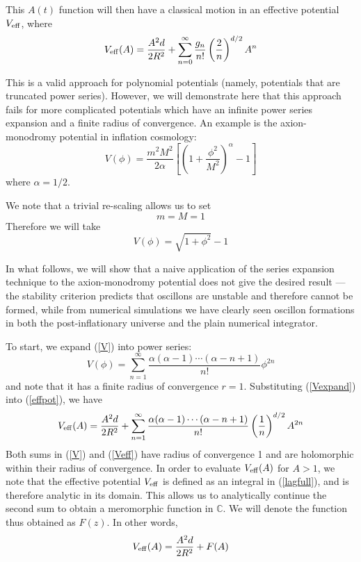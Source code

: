 \documentclass{report}
\begin{document}
This $A(t)$ function will then have a classical motion in an effective potential $V_{\rm eff}$, where
\begin{equation}\label{effpot}
  V_{\rm eff}(A) = \frac{A^2d}{2R^2} +
  \sum_{n=0}^\infty \frac{g_n}{n!}\left(\frac{2}{n}\right)^{d/2} A^n
\end{equation}

This is a valid approach for polynomial potentials (namely, potentials that are truncated power series). However, we will demonstrate here that this approach fails for more complicated potentials which have an infinite power series expansion and a finite radius of convergence. An example is the axion-monodromy potential in inflation cosmology:
\begin{equation}
  V(\phi) = \frac{m^2M^2}{2\alpha}\left[\left(1+\frac{\phi^2}{M^2}\right)^\alpha-1\right]
\end{equation}
where $\alpha=1/2$.

We note that a trivial re-scaling allows us to set
\begin{equation}
  m=M=1
\end{equation}
Therefore we will take
\begin{equation}\label{V}
  V(\phi)=\sqrt{1+\phi^2}-1
\end{equation}

In what follows, we will show that a naive application of the series expansion technique to the axion-monodromy potential does not give the desired result --- the stability criterion predicts that oscillons are unstable and therefore cannot be formed, while from numerical simulations we have clearly seen oscillon formations in both the post-inflationary universe and the plain numerical integrator.

To start, we expand (\ref{V}) into power series:
\begin{equation}\label{Vexpand}
  V(\phi)=\sum_{n=1}^\infty\frac{\alpha(\alpha-1)\cdots(\alpha-n+1)}{n!}\phi^{2n}
\end{equation}
and note that it has a finite radius of convergence $r=1$. Substituting (\ref{Vexpand}) into (\ref{effpot}), we have
\begin{equation}\label{Veff}
  V_{\rm eff}(A)=\frac{A^2d}{2R^2} + \sum_{n=1}^\infty\frac{\alpha(\alpha-1)\cdots(\alpha-n+1)}{n!}
  \left(\frac{1}{n}\right)^{d/2}A^{2n}
\end{equation}
Both sums in (\ref{V}) and (\ref{Veff}) have radius of convergence 1 and are holomorphic within their radius of convergence. In order to evaluate $V_{\rm eff}(A)$ for $A>1$, we note that the effective potential $V_{\rm eff}$ is defined as an integral in (\ref{lagfull}), and is therefore analytic in its domain. This allows us to analytically continue the second sum to obtain a meromorphic function in $\mathbb{C}$. We will denote the function thus obtained as $F(z)$. In other words,
\begin{equation}\label{VeffFz}
  V_{\rm eff}(A) = \frac{A^2d}{2R^2} + F(A)
\end{equation}
\end{document}
